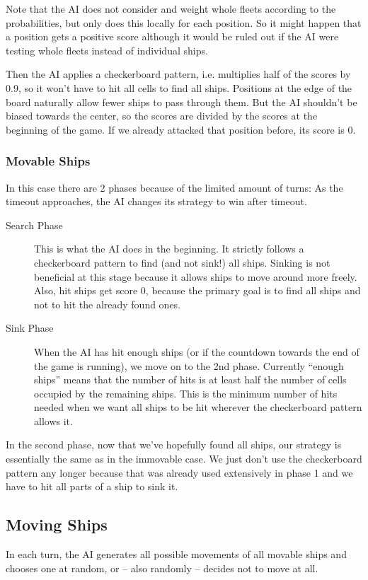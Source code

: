 \documentclass[a4paper]{easychair}
\begin{document}
Note that the AI does not consider and weight whole fleets according to the probabilities, but only does this locally for each position. So it might happen that a position gets a positive score although it would be ruled out if the AI were testing whole fleets instead of individual ships.

Then the AI applies a checkerboard pattern, i.e. multiplies half of the scores by 0.9, so it won't have to hit all cells to find all ships. Positions at the edge of the board naturally allow fewer ships to pass through them. But the AI shouldn't be biased towards the center, so the scores are divided by the scores at the beginning of the game. If we already attacked that position before, its score is 0.

\subsubsection{Movable Ships} In this case there are 2 phases because of the limited amount of turns: As the timeout approaches, the AI changes its strategy to win after timeout. 
\begin{description}
 \item[Search Phase] 
 This is what the AI does in the beginning. It strictly follows a checkerboard pattern to find (and not sink!) all ships. Sinking is not beneficial at this stage because it allows ships to move around more freely. Also, hit ships get score 0, because the primary goal is to find all ships and not to hit the already found ones.
 \item[Sink Phase] 
 When the AI has hit enough ships (or if the countdown towards the end of the game is running), we move on to the 2nd phase. Currently ``enough ships'' means that the number of hits is at least half the number of cells occupied by the remaining ships. This is the minimum number of hits needed when we want all ships to be hit wherever the checkerboard pattern allows it.
\end{description}
In the second phase, now that we've hopefully found all ships, our strategy is essentially the same as in the immovable case. We just don't use the checkerboard pattern any longer because that was already used extensively in phase 1 and we have to hit all parts of a ship to sink it.


\subsection{Moving Ships}
In each turn, the AI generates all possible movements of all movable ships and chooses one at random, or -- also randomly -- decides not to move at all. %
\end{document}
